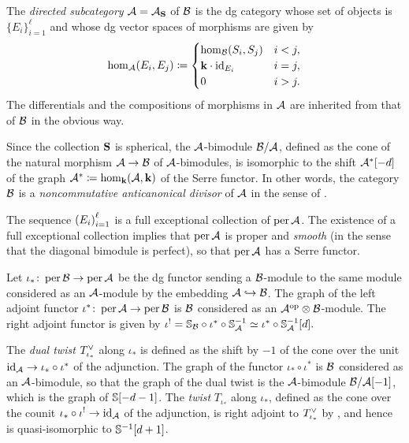 \documentclass[a4paper,12pt]{amsart}
\begin{document}
The \emph{directed subcategory}
$\mathcal{A} = \mathcal{A}_{\mathbf{S}}$
of $\mathcal{B}$
is the dg category whose set of objects is
$\{ E_i \}_{i=1}^\ell$
and
whose dg vector spaces of morphisms are given by
\begin{align}
 \hom_{\mathcal{A}}(E_i, E_j) \coloneqq
\begin{cases}
 \hom_{\mathcal{B}}(S_i, S_j) & i < j,\\
 \mathbf{k} \cdot \operatorname{id}_{E_i} & i=j, \\
 0 & i>j.
\end{cases}
\end{align}
The differentials and the compositions of morphisms in $\mathcal{A}$
are inherited from that of $\mathcal{B}$
in the obvious way.

Since the collection $\mathbf{S}$ is spherical,
the $\mathcal{A}$-bimodule $\mathcal{B}/\mathcal{A}$,
defined as the cone of the natural morphism
$\mathcal{A} \to \mathcal{B}$ of $\mathcal{A}$-bimodules,
is isomorphic to the shift
$
\mathcal{A}^*[-d]
$
of the graph
$
\mathcal{A}^* \coloneqq \hom_{\mathbf{k}}(\mathcal{A}, \mathbf{k})
$
of the Serre functor.
In other words,
the category $\mathcal{B}$ is a
\emph{noncommutative anticanonical divisor}
of $\mathcal{A}$
in the sense of
\cite{MR3727564}.

The sequence
$\left( E_i \right)_{i=1}^\ell$
is a full exceptional collection of $\operatorname{per} \mathcal{A}$.
The existence of a full exceptional collection
implies that $\operatorname{per} \mathcal{A}$ is proper and \emph{smooth}
(in the sense that the diagonal bimodule is perfect),
so that $\operatorname{per} \mathcal{A}$ has a Serre functor.

Let
$
\iota_* \colon \operatorname{per} \mathcal{B} \to \operatorname{per} \mathcal{A}
$
be the dg functor
sending a $\mathcal{B}$-module
to the same module
considered as an $\mathcal{A}$-module
by the embedding $\mathcal{A} \hookrightarrow \mathcal{B}$.
The graph of the left adjoint functor
$
 \iota^* \colon \operatorname{per} \mathcal{A} \to \operatorname{per} \mathcal{B}
$
is $\mathcal{B}$
considered as an $\mathcal{A}^{\mathrm{op}} \otimes \mathcal{B}$-module.
The right adjoint functor
is given by
$
  \iota^!
   = \mathbb{S}_{\mathcal{B}} \circ \iota^* \circ \mathbb{S}_{\mathcal{A}}^{-1}
  \simeq \iota^* \circ \mathbb{S}_{\mathcal{A}}^{-1} [ d ].
$

The \emph{dual twist} $T^\vee_{\iota_*}$
along $\iota_*$ is defined as
the shift by $-1$ of
the cone over the unit
$
\operatorname{id}_{\mathcal{A}} \to \iota_* \circ \iota^*
$
of the adjunction.
The graph of the functor $\iota_* \circ \iota^*$
is $\mathcal{B}$ considered as an $\mathcal{A}$-bimodule,
so that the graph
of the dual twist
is the $\mathcal{A}$-bimodule $\mathcal{B}/\mathcal{A}[-1]$,
which is the graph of $\mathbb{S}[-d-1]$.
The \emph{twist} $T_{\iota_*}$ along $\iota_*$,
defined as the cone over the counit
$
\iota_* \circ \iota^! \to \operatorname{id}_{\mathcal{A}}
$
of the adjunction,
is right adjoint to
$T^\vee_{\iota_*}$
by \cite[Proposition 5.3]{MR3692883},
and hence is
quasi-isomorphic to $\mathbb{S}^{-1}[d+1]$.
\end{document}
